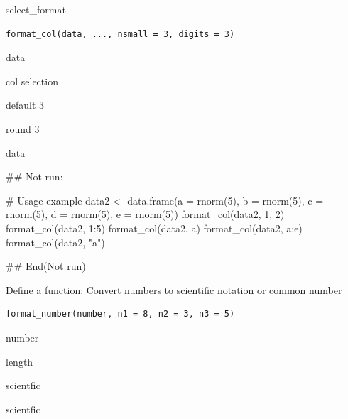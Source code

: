 \documentclass[a4paper]{book}
\begin{document}
%
\begin{Description}
select\_format
\end{Description}
%
\begin{Usage}
\begin{verbatim}
format_col(data, ..., nsmall = 3, digits = 3)
\end{verbatim}
\end{Usage}
%
\begin{Arguments}
\begin{ldescription}
\item[\code{data}] data

\item[\code{...}] col selection

\item[\code{nsmall}] default 3

\item[\code{digits}] round 3
\end{ldescription}
\end{Arguments}
%
\begin{Value}
data
\end{Value}
%
\begin{Examples}
\begin{ExampleCode}


## Not run: 


# Usage example
data2 <- data.frame(a = rnorm(5), b = rnorm(5), c = rnorm(5), d = rnorm(5), e = rnorm(5))
format_col(data2, 1, 2)
format_col(data2, 1:5)
format_col(data2, a)
format_col(data2, a:e)
format_col(data2, "a")

## End(Not run)
\end{ExampleCode}
\end{Examples}
%
\begin{Description}
Define a function: Convert numbers to scientific notation or common number
\end{Description}
%
\begin{Usage}
\begin{verbatim}
format_number(number, n1 = 8, n2 = 3, n3 = 5)
\end{verbatim}
\end{Usage}
%
\begin{Arguments}
\begin{ldescription}
\item[\code{number}] number

\item[\code{n1}] length

\item[\code{n2}] scientfic

\item[\code{n3}] scientfic
\end{ldescription}
\end{Arguments}
\end{document}
